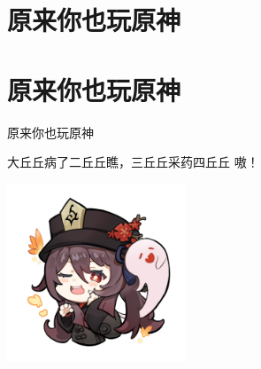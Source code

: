 \def\sectionName{原来你也玩原神}



\isBeamerMode\relax
    \section[\TOCName]{\sectionName}
\fi
\isBeamerMode\relax
    \section[\TOCName\ -\ \sectionName]{\sectionName}
\fi

\begin{frame}

\isBeamerMode\relax
    {\Huge \sectionName}\par
\fi




大丘丘病了二丘丘瞧，三丘丘采药四丘丘 嗷！

\begin{center}
\includegraphics[width=0.4\textwidth]{./pic/hutao.png}
\end{center}


\end{frame}

